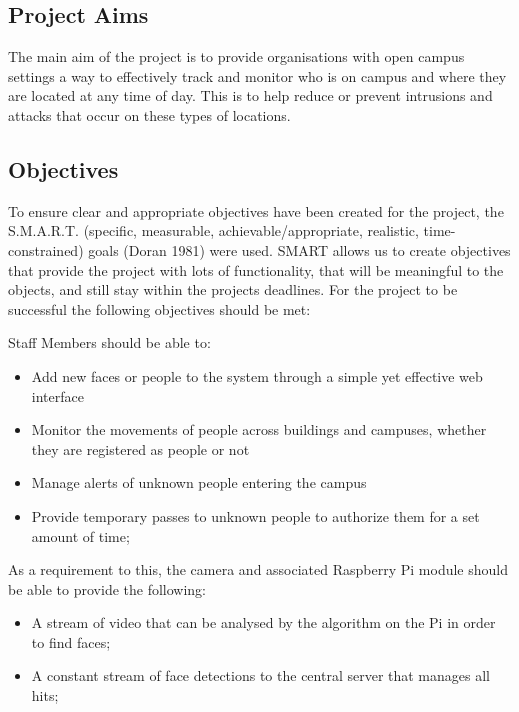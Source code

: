 \documentclass[
  english,
  a4paper,
,tablecaptionabove
]{scrartcl}
\providecommand{\tightlist}{%
  \setlength{\itemsep}{0pt}\setlength{\parskip}{0pt}}
\begin{document}
\newpage

\hypertarget{project-aims}{%
\subsection{Project Aims}\label{project-aims}}

The main aim of the project is to provide organisations with open campus
settings a way to effectively track and monitor who is on campus and
where they are located at any time of day. This is to help reduce or
prevent intrusions and attacks that occur on these types of locations.

\hypertarget{objectives}{%
\subsection{Objectives}\label{objectives}}

To ensure clear and appropriate objectives have been created for the
project, the S.M.A.R.T. (specific, measurable, achievable/appropriate,
realistic, time-constrained) goals (Doran 1981) were used. SMART allows
us to create objectives that provide the project with lots of
functionality, that will be meaningful to the objects, and still stay
within the projects deadlines. For the project to be successful the
following objectives should be met:

Staff Members should be able to:

\begin{itemize}
\tightlist
\item
  Add new faces or people to the system through a simple yet effective
  web interface
\item
  Monitor the movements of people across buildings and campuses, whether
  they are registered as people or not
\item
  Manage alerts of unknown people entering the campus
\item
  Provide temporary passes to unknown people to authorize them for a set
  amount of time;
\end{itemize}

As a requirement to this, the camera and associated Raspberry Pi module
should be able to provide the following:

\begin{itemize}
\tightlist
\item
  A stream of video that can be analysed by the algorithm on the Pi in
  order to find faces;
\item
  A constant stream of face detections to the central server that
  manages all hits;
\end{itemize}
\end{document}
